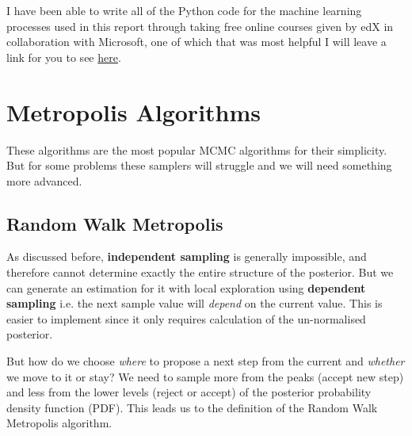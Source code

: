\documentclass[12pt,twoside]{report}   %
\newcommand{\bb}{\textbf}
\newcommand{\ti}{\textit}
\begin{document}
I have been able to write all of the Python code for the machine learning processes used in this report through taking free online courses given by edX in collaboration with Microsoft, one of which that was most helpful I will leave a link for you to see \href{https://www.edx.org/course/principles-of-machine-learning-python-edition-2}{here}.

\chapter{Metropolis Algorithms}\label{Metropolis}

These algorithms are the most popular MCMC algorithms for their simplicity. But for some problems these samplers will struggle and we will need something more advanced.

\section{Random Walk Metropolis}\label{Random Walk Metropolis}
\vspace{-0.4in}
\underline{\hspace{6.2in}}
\vspace{-0.1in}

As discussed before, \bb{independent sampling} is generally impossible, and therefore cannot determine exactly the entire structure of the posterior. But we can generate an estimation for it with local exploration using \bb{dependent sampling} i.e. the next sample value will \ti{depend} on the current value. This is easier to implement since it only requires calculation of the un-normalised posterior.

But how do we choose \ti{where} to propose a next step from the current and \ti{whether} we move to it or stay? We need to sample more from the peaks (accept new step) and less from the lower levels (reject or accept) of the posterior probability density function (PDF). This leads us to the definition of the Random Walk Metropolis algorithm.
\end{document}
